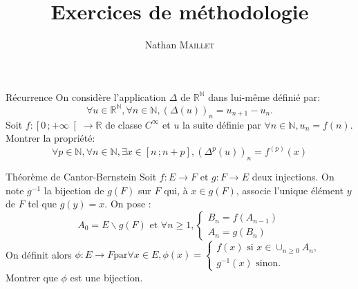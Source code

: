 \documentclass[french, a4paper, 11pt]{article}
\title{Exercices de méthodologie}
\author{Nathan \textsc{Maillet}}
\date{}
\newcommand{\N}{\mathbb{N}}   %
\newcommand{\R}{\mathbb{R}}   %
\newcommand{\interfo}[2]{\left[#1\,;#2\right[}   %
\newcommand{\interff}[2]{\left[#1\,;#2\right]}   %
\begin{document}
\maketitle
\begin{cadre}{Récurrence}
    On considère l'application $\Delta$ de $\R^{\N}$ dans lui-même définié par:
        \[\forall u \in \R^{\N}, \forall n \in \N, (\Delta(u))_n=u_{n+1}-u_n.\]
    Soit \(f: \interfo{0}{+\infty} \rightarrow \R\) de classe \(C^{\infty}\) et $u$ la suite définie par \(\forall n \in \N, u_n=f(n)\). Montrer la propriété:
        \[\forall p \in \N, \forall n \in \N, \exists x \in \interff{n}{n+p}, (\Delta^p(u))_n=f^{(p)}(x)\]
\end{cadre}

\begin{cadre}{Théorème de Cantor-Bernstein}
    Soit \(f:E \rightarrow F \text{ et } g: F \rightarrow E\) deux injections. On note $g^{-1}$ la bijection de $g(F)$ sur $F$ qui, à \(x \in g(F)\), associe l'unique élément $y$ de $F$ tel que \(g(y)=x\). On pose :
        \[A_0=E\backslash g(F) \text{ et } \forall n \geq 1, \begin{cases}
            B_n=f(A_{n-1}) \\
            A_n=g(B_n)
        \end{cases} \]
    On définit alors \(\phi : E \rightarrow F \text{par} \forall x \in E, \phi(x)=\begin{cases}
        f(x) \text{ si } x \in \cup_{n\geq 0}A_n, \\
        g^{-1}(x) \text{ sinon}.
    \end{cases}\)
    Montrer que $\phi$ est une bijection.
\end{cadre}
\end{document}
